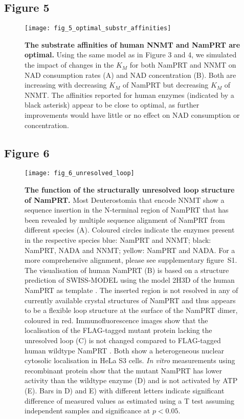 \newpage


\subsection{Figure 5}

\begin{figure}[ht]
  \centering
  \texttt{[image: fig\_5\_optimal\_substr\_affinities]}
  \caption{\textbf{The substrate affinities of human NNMT and NamPRT are optimal.} Using the same model as in Figure 3 and 4, we simulated the impact of changes in the $K_M$  for both NamPRT and NNMT on NAD consumption rates (A) and NAD concentration (B).  Both are increasing with decreasing $K_M$ of NamPRT but decreasing $K_M$ of NNMT. The affinities reported for human enzymes (indicated by a black asterisk) appear to be close to optimal, as further improvements would have little or no effect on NAD consumption or concentration.}
  \label{fig:optimal_substr_affinities}
\end{figure}

\newpage


\subsection{Figure 6}

\begin{figure}[ht]
  \centering
  \texttt{[image: fig\_6\_unresolved\_loop]}
  \caption{\textbf{The function of the structurally unresolved loop structure of NamPRT.} Most Deuterostomia that encode NNMT show a sequence insertion in the N-terminal region of NamPRT that has been revealed by multiple sequence alignment of NamPRT from different species (A). Coloured circles indicate the enzymes present in the respective species blue: NamPRT and NNMT; black: NamPRT, NADA and NNMT; yellow: NamPRT and NADA. For a more comprehensive alignment, please see supplementary figure~S1.  The visualisation of human NamPRT (B) is based on a structure prediction of SWISS-MODEL  \cite{Arnold2006,Biasini2014}  using the model 2H3D of the human NamPRT as template \cite{Wang2006}. The inserted region is not resolved in  any of currently available crystal structures of NamPRT and thus appears to be a flexible loop structure at the surface of the NamPRT dimer, coloured in red.  Immunofluorescence images show that the localisation of the FLAG-tagged mutant protein lacking the unresolved loop (C) is not changed compared to FLAG-tagged human wildtype NamPRT . Both show a heterogeneous nuclear cytosolic localisation in HeLa S3 cells. \textit{In vitro} measurements using recombinant protein  show that the mutant NamPRT has lower activity than the wildtype enzyme (D) and is not activated by ATP (E). Bars in D) and E) with different letters indicate significant difference of measured values as estimated using a T test assuming independent samples and significance at $p < 0.05$.}
  \label{fig:unresolved_loop}
\end{figure}

